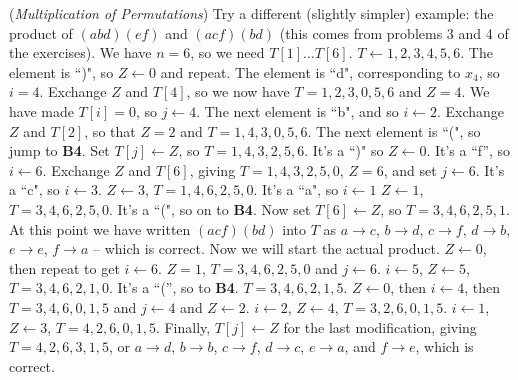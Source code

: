 \vskip 0.15in
 ({\it Multiplication of Permutations})
Try a different (slightly simpler) example:
the product of $\left(a b d\right) \left(e f\right)$ and 
$\left(a c f\right)\left(b d\right)$ (this comes from problems 3 and 4
of the exercises).  We have $n = 6$, so we need $T\left[1\right] \ldots T\left[6\right]$.
\vskip 0.05in
 $T \gets {1, 2, 3, 4, 5, 6}$. \hfil\break
{} The element is ``)", so $Z \gets 0$ and repeat.\hfil\break
{} The element is ``d", corresponding to $x_4$, so $i = 4$.\hfil\break
{} Exchange $Z$ and $T\left[4\right]$, so we now have
 $T = {1, 2, 3, 0, 5, 6}$ and $Z = 4$.  We have made $T\left[i\right] = 0$,
  so $j \gets 4$.\hfil\break
{} The next element is ``b", and so $i \gets 2$.\hfil\break
{} Exchange $Z$ and $T\left[2\right]$, so that
 $Z = 2$ and $T = {1, 4, 3, 0, 5, 6}$.\hfil\break
{} The next element is ``(", so jump to {\bf B4}.\hfil\break
{} Set $T\left[j\right] \gets Z$, so $T = {1, 4, 3, 2, 5, 6}$.\hfil\break
{} It's a ``)" so $Z \gets 0$.\hfil\break
{} It's a ``f'', so $i \gets 6$.\hfil\break
{} Exchange $Z$ and $T\left[6\right]$, giving
 $T = {1, 4, 3, 2, 5, 0}$, $Z = 6$, and set $j \gets 6$.\hfil\break
{} It's a ``c", so $i \gets 3$.\hfil\break
{} $Z \gets 3$, $T = {1, 4, 6, 2, 5, 0}$.\hfil\break
{} It's a ``a", so $i \gets 1$\hfil\break
{} $Z \gets 1$, $T = {3, 4, 6, 2, 5, 0}$.\hfil\break
{} It's a ``(", so on to {\bf B4}.\hfil\break
{} Now set $T\left[6\right] \gets Z$, so
 $T = {3, 4, 6, 2, 5, 1}.$
At this point we have written $\left(a c f\right)\left( b d \right)$ into $T$
as $a \to c$, $b \to d$, $c \to f$, $d \to b$, $e \to e$, $f \to a$ -- which
is correct. Now we will start the actual product. \hfil\break
{} $Z \gets 0$, then repeat to get $i \gets 6$.\hfil\break
{} $Z = 1$, $T = 3, 4, 6, 2, 5, 0$ and $j \gets 6$.\hfil\break
{} $i \gets 5$, $Z \gets 5$, $T = 3, 4, 6, 2, 1, 0$.\hfil\break
{} It's a ``('', so to {\bf B4}.\hfil\break
{} $T = 3, 4, 6, 2, 1, 5$.\hfil\break
{} $Z \gets 0$, then $i \gets 4$, then $T = 3, 4, 6, 0, 1, 5$
and $j \gets 4$ and $Z \gets 2$.\hfil\break
{} $i \gets 2$, $Z \gets 4$, $T = 3, 2, 6, 0, 1, 5$.\hfil\break
{} $i \gets 1$, $Z \gets 3$, $T = 4, 2, 6, 0, 1, 5$.\hfil\break
{} Finally, $T\left[j\right] \gets Z$ for the last modification, giving
$T = 4, 2, 6, 3, 1, 5$, or $a \to d$, $b \to b$, $c \to f$, $d \to c$, $e \to a$, and
$f \to e$, which is correct.

